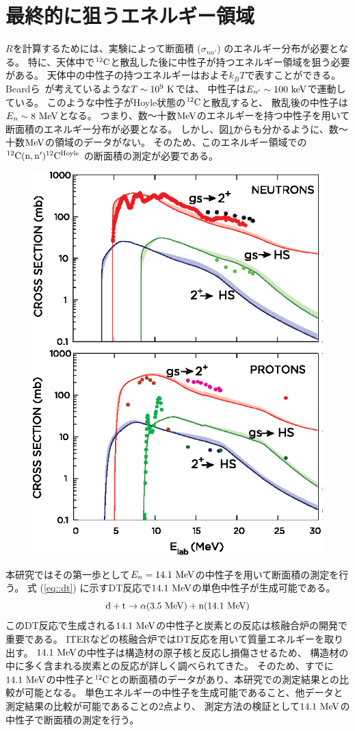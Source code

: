 \section{最終的に狙うエネルギー領域}
$R$を計算するためには、実験によって断面積 ($\sigma_{nn'}$) のエネルギー分布が必要となる。
特に、天体中で${}^{12}\rm{C}$と散乱した後に中性子が持つエネルギー領域を狙う必要がある。
天体中の中性子の持つエネルギーはおよそ$k_{B}T$で表すことができる。
Beardら~\cite{hotdensemedium}が考えているような$T\sim10^{9}~\rm{K}$では、
中性子は$E_{n'}\sim100~\rm{keV}$で運動している。
このような中性子がHoyle状態の${}^{12}\rm{C}$と散乱すると、
散乱後の中性子は$E_{n}\sim8~\rm{MeV}$となる。
つまり、数〜十数$\rm{MeV}$のエネルギーを持つ中性子を用いて断面積のエネルギー分布が必要となる。
しかし、図\ref{fig::crosssection_pres}からも分かるように、数〜十数$\rm{MeV}$の領域のデータがない。
そのため、このエネルギー領域での ${}^{12}\rm{C}(n,n'){}^{12}\rm{C}^{Hoyle}$ の断面積の測定が必要である。
\begin{figure}
  \centering
  \includegraphics[clip,width=0.6\columnwidth]{eps/cross_section_p_and_n.eps}
  \caption{}
  \label{fig::crosssection_pres}
\end{figure}

本研究ではその第一歩として$E_{n} = 14.1~\rm{MeV}$の中性子を用いて断面積の測定を行う。
式 (\ref{eq::dt}) に示すDT反応で$14.1~\rm{MeV}$の単色中性子が生成可能である。
\begin{equation}
  \rm{d} + \rm{t} \rightarrow \alpha (3.5~\rm{MeV}) + \rm{n} (14.1~\rm{MeV})
  \label{eq::dt}
\end{equation}
このDT反応で生成される$14.1~\rm{MeV}$の中性子と炭素との反応は核融合炉の開発で重要である。
ITERなどの核融合炉ではDT反応を用いて質量エネルギーを取り出す。
$14.1~\rm{MeV}$の中性子は構造材の原子核と反応し損傷させるため、
構造材の中に多く含まれる炭素との反応が詳しく調べられてきた。
そのため、すでに$14.1~\rm{MeV}$の中性子と${}^{12}\rm{C}$との断面積のデータがあり、本研究での測定結果との比較が可能となる。
単色エネルギーの中性子を生成可能であること、他データと測定結果の比較が可能であることの2点より、
測定方法の検証として$14.1~\rm{MeV}$の中性子で断面積の測定を行う。

